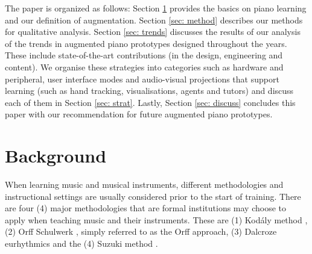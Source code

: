 \documentclass[sigchi, review]{acmart}
\begin{document}
The paper is organized as follows: Section \ref{sec: bg} provides the basics on piano learning and our definition of augmentation. Section \ref{sec: method} describes our methods for qualitative analysis. Section \ref{sec: trends} discusses the results of our analysis of the trends in augmented piano prototypes designed throughout the years. These include state-of-the-art contributions (in the design, engineering and content). We organise these strategies into categories such as hardware and peripheral, user interface modes and audio-visual projections that support learning (such as hand tracking, visualisations, agents and tutors) and discuss each of them in Section \ref{sec: strat}. Lastly, Section \ref{sec: discuss} concludes this paper with our recommendation for future augmented piano prototypes. 



\section{Background}
\label{sec: bg}
When learning music and musical instruments, different methodologies and instructional settings are usually considered prior to the start of training. There are four (4) major methodologies that are formal institutions may choose to apply when teaching music and their instruments. These are (1) Kodály method \cite{choksy1974kodaly}, (2) Orff Schulwerk \cite{shamrock1997orff}, simply referred to as the Orff approach, (3) Dalcroze eurhythmics \cite{mead1994dalcroze} and the (4) Suzuki method \cite{peak1998suzuki}. 
\end{document}
